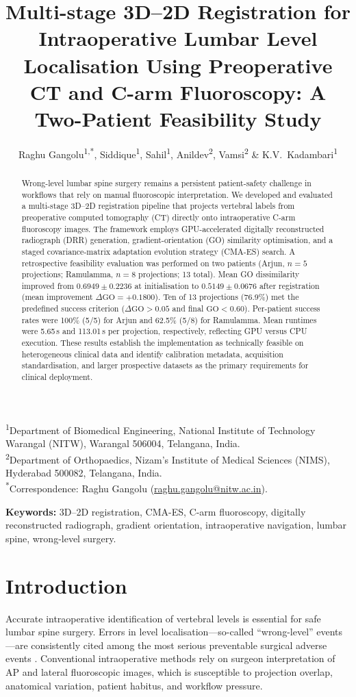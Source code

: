 \documentclass[10pt,a4paper]{article}
\title{Multi-stage 3D--2D Registration for Intraoperative Lumbar
Level Localisation Using Preoperative CT and C-arm Fluoroscopy:
A Two-Patient Feasibility Study}
\author{%
  Raghu Gangolu\textsuperscript{1,*},
  Siddique\textsuperscript{1},
  Sahil\textsuperscript{1},
  Anildev\textsuperscript{2},
  Vamsi\textsuperscript{2} \&
  K.V.\ Kadambari\textsuperscript{1}
}
\date{}
\makeatletter
\newcommand{\affiliations}{%
  \noindent
  \textsuperscript{1}Department of Biomedical Engineering,
  National Institute of Technology Warangal (NITW),
  Warangal 506004, Telangana, India.\\
  \textsuperscript{2}Department of Orthopaedics,
  Nizam's Institute of Medical Sciences (NIMS),
  Hyderabad 500082, Telangana, India.\\
  \textsuperscript{*}Correspondence:
  Raghu Gangolu
  (\href{mailto:raghu.gangolu@nitw.ac.in}{raghu.gangolu@nitw.ac.in}).
}
\makeatother
\begin{document}
\maketitle
\affiliations

\bigskip
\begin{abstract}
\noindent
Wrong-level lumbar spine surgery remains a persistent patient-safety
challenge in workflows that rely on manual fluoroscopic interpretation.
We developed and evaluated a multi-stage 3D--2D registration pipeline
that projects vertebral labels from preoperative computed tomography (CT)
directly onto intraoperative C-arm fluoroscopy images.
The framework employs GPU-accelerated digitally reconstructed radiograph
(DRR) generation, gradient-orientation (GO) similarity optimisation, and
a staged covariance-matrix adaptation evolution strategy (CMA-ES) search.
A retrospective feasibility evaluation was performed on two patients
(Arjun, $n=5$ projections; Ramulamma, $n=8$ projections; 13 total).
Mean GO dissimilarity improved from $0.6949 \pm 0.2236$ at
initialisation to $0.5149 \pm 0.0676$ after registration
(mean improvement $\Delta\mathrm{GO} = +0.1800$).
Ten of 13 projections (76.9\%) met the predefined success criterion
($\Delta\mathrm{GO}>0.05$ and final $\mathrm{GO}<0.60$).
Per-patient success rates were 100\% (5/5) for Arjun
and 62.5\% (5/8) for Ramulamma.
Mean runtimes were 5.65\,s and 113.01\,s per projection,
respectively, reflecting GPU versus CPU execution.
These results establish the implementation as technically feasible on
heterogeneous clinical data and identify calibration metadata,
acquisition standardisation, and larger prospective datasets as the
primary requirements for clinical deployment.
\end{abstract}

\medskip
\noindent\textbf{Keywords:}
3D--2D registration, CMA-ES, C-arm fluoroscopy, digitally reconstructed
radiograph, gradient orientation, intraoperative navigation,
lumbar spine, wrong-level surgery.

\newpage

\section{Introduction}
\label{sec:intro}

Accurate intraoperative identification of vertebral levels is essential
for safe lumbar spine surgery.
Errors in level localisation—so-called ``wrong-level'' events—are
consistently cited among the most serious preventable surgical adverse
events \citep{EubanksMendel2011,Mody2008}.
Conventional intraoperative methods rely on surgeon interpretation of
AP and lateral fluoroscopic images, which is susceptible to projection
overlap, anatomical variation, patient habitus, and workflow pressure.
\end{document}
